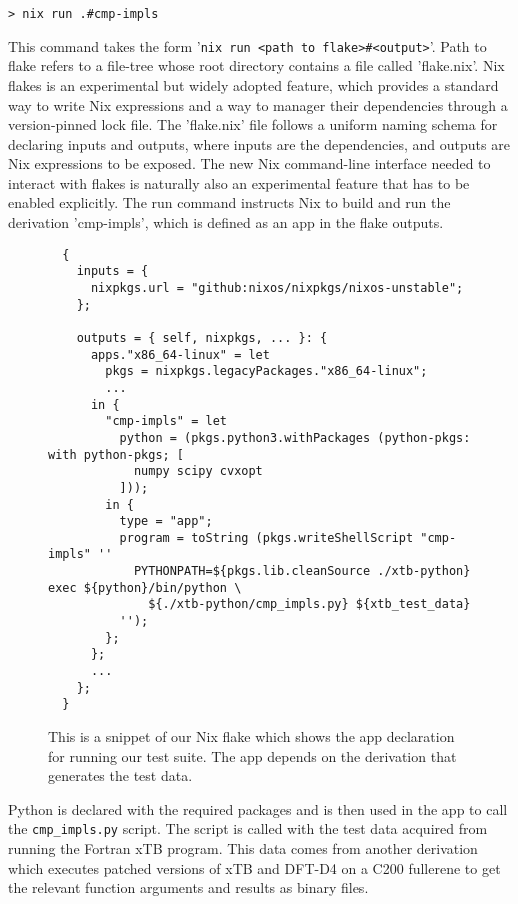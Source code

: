 \begin{verbatim}
> nix run .#cmp-impls
\end{verbatim}


This command takes the form '\verb|nix run <path to flake>#<output>|'. Path to flake refers to a file-tree whose root directory contains a file called 'flake.nix'. Nix flakes is an experimental but widely adopted feature, which provides a standard way to write Nix expressions and a way to manager their dependencies through a version-pinned lock file. The 'flake.nix' file follows a uniform naming schema for declaring inputs and outputs, where inputs are the dependencies, and outputs are Nix expressions to be exposed.
The new Nix command-line interface needed to interact with flakes is naturally also an experimental feature that has to be enabled explicitly. The run command instructs Nix to build and run the derivation 'cmp-impls', which is defined as an app in the flake outputs.

\begin{figure}[H]
\begin{verbatim}
  {
    inputs = {
      nixpkgs.url = "github:nixos/nixpkgs/nixos-unstable";
    };

    outputs = { self, nixpkgs, ... }: {
      apps."x86_64-linux" = let
        pkgs = nixpkgs.legacyPackages."x86_64-linux";
        ...
      in {
        "cmp-impls" = let
          python = (pkgs.python3.withPackages (python-pkgs: with python-pkgs; [
            numpy scipy cvxopt
          ]));
        in {
          type = "app";
          program = toString (pkgs.writeShellScript "cmp-impls" ''
            PYTHONPATH=${pkgs.lib.cleanSource ./xtb-python} exec ${python}/bin/python \
              ${./xtb-python/cmp_impls.py} ${xtb_test_data}
          '');
        };
      };
      ...
    };
  }
\end{verbatim}
\caption{This is a snippet of our Nix flake which shows the app declaration for running our test suite. The app depends on the derivation that generates the test data.}
\label{fig:nix-flake}
\end{figure}

Python is declared with the required packages and is then used in the app to call the \verb|cmp_impls.py| script. The script is called with the test data acquired from running the Fortran xTB program. This data comes from another derivation which executes patched versions of xTB and DFT-D4 on a C200 fullerene to get the relevant function arguments and results as binary files.

